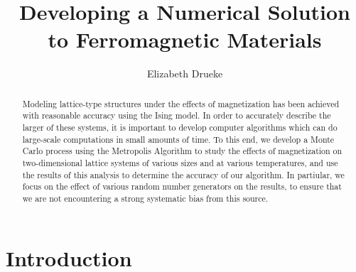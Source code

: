 \documentclass[12pt]{article}
\title{Developing a Numerical Solution to Ferromagnetic Materials}
\author{Elizabeth Drueke}
\numberwithin{equation}{section}
\begin{document}
\maketitle

\begin{abstract}
Modeling lattice-type structures under the effects of magnetization has been achieved with reasonable accuracy using the Ising model.  In order to accurately describe the larger of these systems, it is important to develop computer algorithms which can do large-scale computations in small amounts of time.  To this end, we develop a Monte Carlo process using the Metropolis Algorithm to study the effects of magnetization on two-dimensional lattice systems of various sizes and at various temperatures, and use the results of this analysis to determine the accuracy of our algorithm.  In partiular, we focus on the effect of various random number generators on the results, to ensure that we are not encountering a strong systematic bias from this source.
\end{abstract}

\section{Introduction}
\label{sec:intro}
\end{document}
